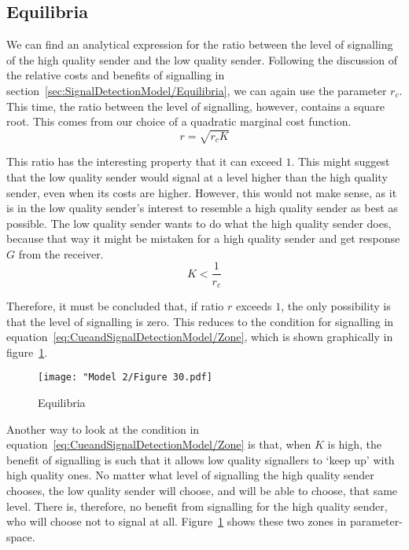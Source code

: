 \documentclass[a4paper,12pt]{article}
\numberwithin{equation}{section}
\begin{document}
\subsection{Equilibria}
\label{sec:CueandSignalDetectionModel/Equilibria}

We can find an analytical expression for the ratio between the level of signalling of the high quality sender and the low quality sender. Following the discussion of the relative costs and benefits of signalling in section~\ref{sec:SignalDetectionModel/Equilibria}, we can again use the parameter $r_{c}$. This time, the ratio between the level of signalling, however, contains a square root. This comes from our choice of a quadratic marginal cost function.
\begin{equation}
\label{eq:CueandSignalDetectionModel/Ratio}
r=\sqrt{r_{c} K}
\end{equation}

This ratio has the interesting property that it can exceed $1$. This might suggest that the low quality sender would signal at a level higher than the high quality sender, even when its costs are higher. However, this would not make sense, as it is in the low quality sender's interest to resemble a high quality sender as best as possible. The low quality sender wants to do what the high quality sender does, because that way it might be mistaken for a high quality sender and get response $G$ from the receiver.
\begin{equation}
\label{eq:CueandSignalDetectionModel/Zone}
K <\frac{1}{r_{c}}
\end{equation}

Therefore, it must be concluded that, if ratio $r$ exceeds $1$, the only possibility is that the level of signalling is zero. This reduces to the condition for signalling in equation~\ref{eq:CueandSignalDetectionModel/Zone}, which is shown graphically in figure~\ref{fig:Model 2/Figure 30.pdf}.

\begin{figure}[h]
\begin{center}
\leavevmode
\texttt{[image: "Model 2/Figure 30.pdf]}
\caption{Equilibria}
\label{fig:Model 2/Figure 30.pdf}
\end{center}
\end{figure}

Another way to look at the condition in equation~\ref{eq:CueandSignalDetectionModel/Zone} is that, when $K$ is high, the benefit of signalling is such that it allows low quality signallers to `keep up' with high quality ones. No matter what level of signalling the high quality sender chooses, the low quality sender will choose, and will be able to choose, that same level. There is, therefore, no benefit from signalling for the high quality sender, who will choose not to signal at all. Figure~\ref{fig:Model 2/Figure 30.pdf} shows these two zones in parameter-space.
\end{document}
